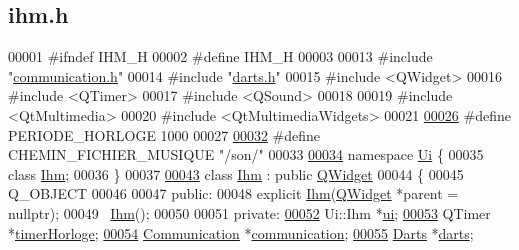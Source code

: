 \hypertarget{ihm_8h_source}{}\subsection{ihm.\+h}

\begin{DoxyCode}
00001 \textcolor{preprocessor}{#ifndef IHM\_H}
00002 \textcolor{preprocessor}{#define IHM\_H}
00003 
00013 \textcolor{preprocessor}{#include "\hyperlink{communication_8h}{communication.h}"}
00014 \textcolor{preprocessor}{#include "\hyperlink{darts_8h}{darts.h}"}
00015 \textcolor{preprocessor}{#include <QWidget>}
00016 \textcolor{preprocessor}{#include <QTimer>}
00017 \textcolor{preprocessor}{#include <QSound>}
00018 
00019 \textcolor{preprocessor}{#include <QtMultimedia>}
00020 \textcolor{preprocessor}{#include <QtMultimediaWidgets>}
00021 
\hyperlink{ihm_8h_abe1de80d8a7149cf82da305f032d7b1e}{00026} \textcolor{preprocessor}{#define PERIODE\_HORLOGE     1000}
00027 
\hyperlink{ihm_8h_aaf7f17312e64cf24f4c93fc657e5594f}{00032} \textcolor{preprocessor}{#define CHEMIN\_FICHIER\_MUSIQUE "/son/"}
00033 
\hyperlink{namespace_ui}{00034} \textcolor{keyword}{namespace }\hyperlink{namespace_ui}{Ui} \{
00035 \textcolor{keyword}{class }\hyperlink{class_ihm}{Ihm};
00036 \}
00037 
\hyperlink{class_ihm}{00043} \textcolor{keyword}{class }\hyperlink{class_ihm}{Ihm} : \textcolor{keyword}{public} \hyperlink{class_q_widget}{QWidget}
00044 \{
00045     Q\_OBJECT
00046 
00047 \textcolor{keyword}{public}:
00048     \textcolor{keyword}{explicit} \hyperlink{class_ihm}{Ihm}(\hyperlink{class_q_widget}{QWidget} *parent = \textcolor{keyword}{nullptr});
00049     ~\hyperlink{class_ihm}{Ihm}();
00050 
00051 \textcolor{keyword}{private}:
\hyperlink{class_ihm_a0ac5f47856566ceeeca1720109bf70ea}{00052}     Ui::Ihm *\hyperlink{class_ihm_a0ac5f47856566ceeeca1720109bf70ea}{ui};                        
\hyperlink{class_ihm_a21ea35b212966fa2805241ea6237d351}{00053}     QTimer *\hyperlink{class_ihm_a21ea35b212966fa2805241ea6237d351}{timerHorloge};               
\hyperlink{class_ihm_a2f3d4781795781a840786cd8c2233899}{00054}     \hyperlink{class_communication}{Communication} *\hyperlink{class_ihm_a2f3d4781795781a840786cd8c2233899}{communication};       
\hyperlink{class_ihm_a2a0f54d33f4d6b2531ec2190c4a2356e}{00055}     \hyperlink{class_darts}{Darts} *\hyperlink{class_ihm_a2a0f54d33f4d6b2531ec2190c4a2356e}{darts};                       

\end{DoxyCode}
